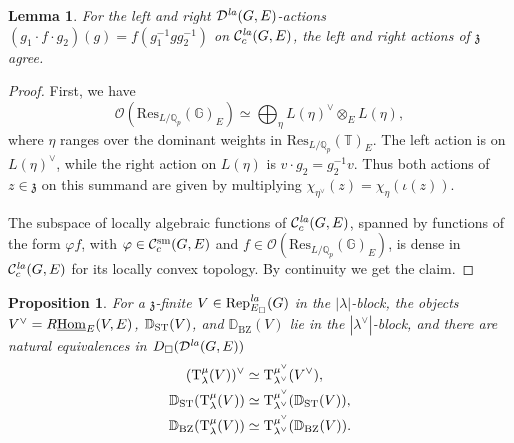 \documentclass[a4paper,10pt]{amsart}
\theoremstyle{remark}
\theoremstyle{definition}
\theoremstyle{plain}
\newtheorem{lemma}[theorem]{Lemma}
\newtheorem{proposition}[theorem]{Proposition}
\numberwithin{equation}{section}
\newcommand{\bbD}{{\mathbb D}}
\newcommand{\bbG}{{\mathbb G}}
\newcommand{\bbQ}{{\mathbb Q}}
\newcommand{\bbT}{{\mathbb T}}
\newcommand{\frz}{{\mathfrak z}}
\newcommand{\calC}{{\mathcal C}}
\newcommand{\calD}{{\mathcal D}}
\newcommand{\calO}{{\mathcal O}}
\newcommand{\Hom}{{\rm Hom}}
\newcommand{\uHom}{\underline{\Hom}}
\newcommand{\la}{{\it la}}
\newcommand{\Rep}{{\rm Rep}}
\newcommand{\sm}{{\rm sm}}
\newcommand{\ST}{{\rm ST}}
\newcommand{\BZ}{\ensuremath{\mathrm{BZ}}}
\begin{document}
\begin{lemma}\label{lem:central-actions-analytic-kernel}
For the left and right $\calD^{\la}(G,E)$-actions $(g_1\cdot f\cdot g_2)(g)=f(g_1^{-1}gg_2^{-1})$ on $\calC_c^{\la}(G,E)$, the left and right actions of $\frz$ agree.
\end{lemma}

\begin{proof}
First, we have \cite[II.4.20, Remark]{Jantzen2003representations}
\[
 \calO(\mathrm{Res}_{L/\bbQ_p}(\bbG)_E)
\simeq\bigoplus_\eta L(\eta)^\vee\otimes_E L(\eta),
\]
where $\eta$ ranges over the dominant weights in $\mathrm{Res}_{L/\bbQ_p}(\bbT)_E$. The left action is on $L(\eta)^\vee$, while the right action on $L(\eta)$ is $v\cdot g_2=g_2^{-1}v$. Thus both actions of $z\in\frz$ on this summand are given by multiplying $\chi_{\eta^\vee}(z)=\chi_\eta(\iota(z))$.

The subspace of locally algebraic functions of $\calC_c^{\la}(G,E)$, spanned by functions of the form $\varphi f$, with $\varphi\in \calC_c^{\sm}(G,E)$ and $f\in \calO(\mathrm{Res}_{L/\bbQ_p}(\bbG)_E)$, is dense in $\calC_c^{\la}(G,E)$ for its locally convex topology. By continuity we get the claim.
\end{proof}

\begin{proposition}\label{prop:translation-duality}
For a $\frz$-finite $V\in\Rep^{\la}_{E_\square}(G)$ in the $|\lambda|$-block, the objects $V^\vee=R\uHom_E(V,E)$, $\bbD_{\ST}(V)$, and $\bbD_{\BZ}(V)$ lie in the $|\lambda^\vee|$-block, and there are natural equivalences in $D_{\square}(\calD^{\la}(G,E))$
\[
\begin{aligned}
 (\mathrm T_\lambda^\mu(V))^\vee
 &\simeq
 \mathrm T_{\lambda^\vee}^{\mu^\vee}(V^\vee),\\
 \bbD_{\ST}(\mathrm T_\lambda^\mu(V))
 &\simeq
 \mathrm T_{\lambda^\vee}^{\mu^\vee}(\bbD_{\ST}(V)),\\
 \bbD_{\BZ}(\mathrm T_\lambda^\mu(V))
 &\simeq
 \mathrm T_{\lambda^\vee}^{\mu^\vee}(\bbD_{\BZ}(V)).
\end{aligned}
\]
\end{proposition}
\end{document}
